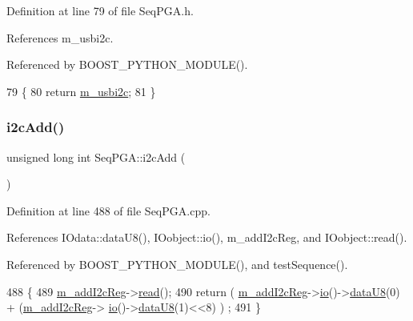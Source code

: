 Definition at line 79 of file Seq\+P\+G\+A.\+h.



References m\+\_\+usbi2c.



Referenced by B\+O\+O\+S\+T\+\_\+\+P\+Y\+T\+H\+O\+N\+\_\+\+M\+O\+D\+U\+L\+E().


\begin{DoxyCode}
79                     \{
80     \textcolor{keywordflow}{return} \hyperlink{classSeqPGA_a31d692cdc2f70dfd71671f3e2d688e20}{m\_usbi2c};
81   \}
\end{DoxyCode}
\mbox{\label{classSeqPGA_a67022684977cb2f6335eb6b21262fe89}} 
\subsubsection{\texorpdfstring{i2c\+Add()}{i2cAdd()}}
{\footnotesize\ttfamily unsigned long int Seq\+P\+G\+A\+::i2c\+Add (\begin{DoxyParamCaption}{ }\end{DoxyParamCaption})}



Definition at line 488 of file Seq\+P\+G\+A.\+cpp.



References I\+Odata\+::data\+U8(), I\+Oobject\+::io(), m\+\_\+add\+I2c\+Reg, and I\+Oobject\+::read().



Referenced by B\+O\+O\+S\+T\+\_\+\+P\+Y\+T\+H\+O\+N\+\_\+\+M\+O\+D\+U\+L\+E(), and test\+Sequence().


\begin{DoxyCode}
488                                 \{
489   \hyperlink{classSeqPGA_ac3a6aad3fec65ceb78528b6d20deeb3f}{m\_addI2cReg}->\hyperlink{classIOobject_aa07610c11963b1db6710e3c76ceea456}{read}();
490   \textcolor{keywordflow}{return} ( \hyperlink{classSeqPGA_ac3a6aad3fec65ceb78528b6d20deeb3f}{m\_addI2cReg}->\hyperlink{classIOobject_af04fb94137c3d86849f478ac5afab5d1}{io}()->\hyperlink{classIOdata_a75e9c318dbac3a39402179070943d4bc}{dataU8}(0) + (\hyperlink{classSeqPGA_ac3a6aad3fec65ceb78528b6d20deeb3f}{m\_addI2cReg}->
      \hyperlink{classIOobject_af04fb94137c3d86849f478ac5afab5d1}{io}()->\hyperlink{classIOdata_a75e9c318dbac3a39402179070943d4bc}{dataU8}(1)<<8) ) ;
491 \}
\end{DoxyCode}
\mbox{\label{classSeqPGA_a3d441522bfe5a6d35b8a77cbcd38b49e}} 
